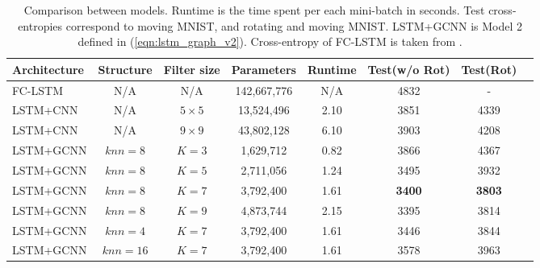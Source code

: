 \documentclass{article}
\newcommand{\eqnref}[1]{(\ref{eqn:#1})}
\begin{document}
\begin{table}
	\centering
	{\small
	\begin{tabular}{lccccccc}
		\toprule
		Architecture & Structure & Filter size & Parameters & Runtime & Test(w/o Rot) & Test(Rot) \\%
		\midrule
		FC-LSTM & N/A & N/A & 142,667,776 & N/A & 4832 & - \\%
		LSTM+CNN & N/A & $5 \times 5$ & 13,524,496 & 2.10 & 3851 & 4339 \\%
		LSTM+CNN & N/A & $9 \times 9$ & 43,802,128 & 6.10 & 3903 & 4208 \\%

		LSTM+GCNN & $knn=8$ & $K=3$ & 1,629,712 & 0.82 & 3866 & 4367 \\%
		LSTM+GCNN & $knn=8$ & $K=5$ & 2,711,056 & 1.24 & 3495 & 3932 \\%
		LSTM+GCNN & $knn=8$ & $K=7$ & 3,792,400 & 1.61 & {\bf 3400} & {\bf 3803} \\%
		LSTM+GCNN & $knn=8$ & $K=9$ & 4,873,744 & 2.15 & 3395 & 3814 \\%
		
		LSTM+GCNN & $knn=4$ & $K=7$ & 3,792,400 & 1.61 & 3446 & 3844 \\%
		LSTM+GCNN & $knn=16$ & $K=7$ & 3,792,400 & 1.61 & 3578 & 3963 \\%
		\bottomrule
	\end{tabular}
	}
	\caption{Comparison between models. Runtime is the time spent per each mini-batch in seconds. Test cross-entropies correspond to moving MNIST, and rotating and moving MNIST. LSTM+GCNN is Model 2 defined in \eqnref{lstm_graph_v2}. Cross-entropy of FC-LSTM is taken from \cite{convlstm}.}
	\label{tab:moving_mnist}
\end{table}
\end{document}
